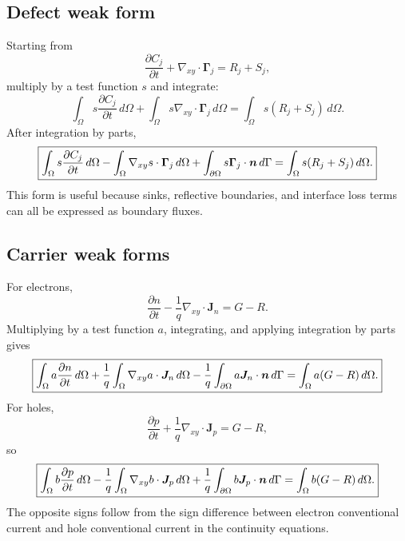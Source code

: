 \documentclass[11pt]{article}
\newcommand{\Jvec}{\bm{J}}
\newcommand{\Gammavec}{\bm{\Gamma}}
\newcommand{\gradxy}{\nabla_{xy}}
\newcommand{\divxy}{\nabla_{xy}\cdot}
\newcommand{\OmegaD}{\Omega}
\begin{document}
\subsection{Defect weak form}

Starting from
\begin{equation}
\frac{\partial C_j}{\partial t}+\divxy\Gammavec_j=R_j+S_j,
\end{equation}
multiply by a test function \(s\) and integrate:
\begin{equation}
\int_{\OmegaD}s\frac{\partial C_j}{\partial t}\,d\Omega
+
\int_{\OmegaD}s\divxy\Gammavec_j\,d\Omega
=
\int_{\OmegaD}s(R_j+S_j)\,d\Omega.
\end{equation}
After integration by parts,
\begin{equation}
\boxed{
\int_{\OmegaD}s\frac{\partial C_j}{\partial t}\,d\Omega
-
\int_{\OmegaD}\gradxy s\cdot\Gammavec_j\,d\Omega
+
\int_{\partial\OmegaD}s\Gammavec_j\cdot\nvec\,d\Gamma
=
\int_{\OmegaD}s(R_j+S_j)\,d\Omega.}
\label{eq:weak_defect}
\end{equation}
This form is useful because sinks, reflective boundaries, and interface loss terms can all be expressed as boundary fluxes.

\subsection{Carrier weak forms}

For electrons,
\begin{equation}
\frac{\partial n}{\partial t}-\frac{1}{q}\divxy\Jvec_n=G-R.
\end{equation}
Multiplying by a test function \(a\), integrating, and applying integration by parts gives
\begin{equation}
\boxed{
\int_{\OmegaD}a\frac{\partial n}{\partial t}\,d\Omega
+
\frac{1}{q}\int_{\OmegaD}\gradxy a\cdot\Jvec_n\,d\Omega
-
\frac{1}{q}\int_{\partial\OmegaD}a\Jvec_n\cdot\nvec\,d\Gamma
=
\int_{\OmegaD}a(G-R)\,d\Omega.}
\label{eq:weak_electron}
\end{equation}
For holes,
\begin{equation}
\frac{\partial p}{\partial t}+\frac{1}{q}\divxy\Jvec_p=G-R,
\end{equation}
so
\begin{equation}
\boxed{
\int_{\OmegaD}b\frac{\partial p}{\partial t}\,d\Omega
-
\frac{1}{q}\int_{\OmegaD}\gradxy b\cdot\Jvec_p\,d\Omega
+
\frac{1}{q}\int_{\partial\OmegaD}b\Jvec_p\cdot\nvec\,d\Gamma
=
\int_{\OmegaD}b(G-R)\,d\Omega.}
\label{eq:weak_hole}
\end{equation}
The opposite signs follow from the sign difference between electron conventional current and hole conventional current in the continuity equations.
\end{document}
